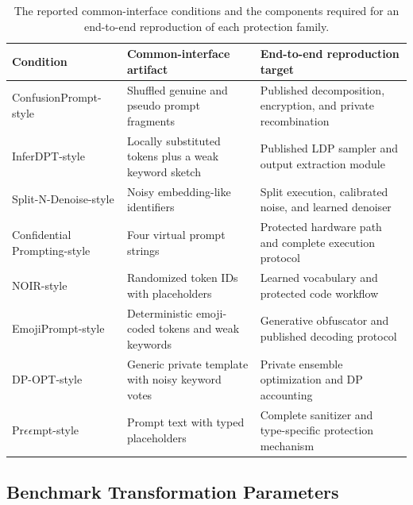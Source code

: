 \documentclass[letterpaper]{article} %
\begin{document}
\begin{table}[t]
\centering
\small
\setlength{\tabcolsep}{4pt}
\begin{tabular}{p{}p{}p{}}
\toprule
Condition & Common-interface artifact & End-to-end reproduction target \\
\midrule
ConfusionPrompt-style & Shuffled genuine and pseudo prompt fragments & Published decomposition, encryption, and private recombination \\
InferDPT-style & Locally substituted tokens plus a weak keyword sketch & Published LDP sampler and output extraction module \\
Split-N-Denoise-style & Noisy embedding-like identifiers & Split execution, calibrated noise, and learned denoiser \\
Confidential Prompting-style & Four virtual prompt strings & Protected hardware path and complete execution protocol \\
NOIR-style & Randomized token IDs with placeholders & Learned vocabulary and protected code workflow \\
EmojiPrompt-style & Deterministic emoji-coded tokens and weak keywords & Generative obfuscator and published decoding protocol \\
DP-OPT-style & Generic private template with noisy keyword votes & Private ensemble optimization and DP accounting \\
Pr$\epsilon\epsilon$mpt-style & Prompt text with typed placeholders & Complete sanitizer and type-specific protection mechanism \\
\bottomrule
\end{tabular}
\caption{The reported common-interface conditions and the components required for an end-to-end reproduction of each protection family.}
\label{tab:benchmark_scope}
\end{table}

\subsection{Benchmark Transformation Parameters}
\end{document}
